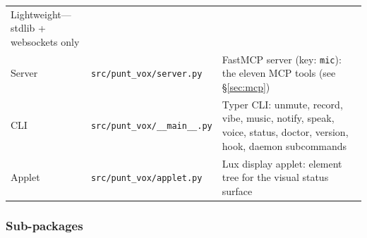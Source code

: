 \documentclass[a4paper,10pt]{article}
\newcommand{\modpath}[1]{\texttt{src/punt\_vox/#1}}
\begin{document}
\begin{center}
\begin{longtable}{llp{6.2cm}}
             Lightweight---stdlib + websockets only \\
Server     & \modpath{server.py}     & FastMCP server (key: \texttt{mic}):
             the eleven MCP tools (see \S\ref{sec:mcp}) \\
CLI        & \modpath{\_\_main\_\_.py} & Typer CLI: unmute, record, vibe,
             music, notify, speak, voice, status, doctor, version, hook,
             daemon subcommands \\
Applet     & \modpath{applet.py}     & Lux display applet: element tree
             for the visual status surface \\
\bottomrule
\end{longtable}
\end{center}

\subsubsection*{Sub-packages}
\end{document}
